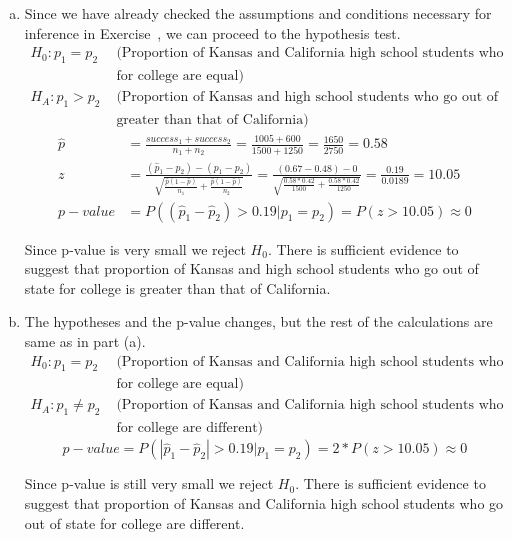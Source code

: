 {
\begin{enumerate}[(a)]

\item Since we have already checked the assumptions and conditions necessary for inference in Exercise~, we can proceed to the hypothesis test.
\begin{align*}
H_0: p_1 = p_2 &\text{ (Proportion of Kansas and California high school students who go out of state} \\
&\text{ for college are equal)} \\
H_A: p_1 > p_2 &\text{ (Proportion of Kansas and high school students who go out of state for college is} \\
&\text{ greater than that of California)}
\end{align*}
\begin{align*}
\hat{p} &= \frac{success_1 + success_2}{n_1 + n_2} = \frac{1005 + 600}{1500 + 1250} = \frac{1650}{2750} = 0.58 \\
z &= \frac{(\hat{p}_1 - \hat{p}_2) - (p_1 - p_2)}{\sqrt{ \frac{\hat{p} (1 - \hat{p})}{n_1} + \frac{\hat{p} (1 - \hat{p})}{n_2} }} = \frac{(0.67 - 0.48) - 0}{\sqrt{ \frac{0. 58 * 0.42}{1500} + \frac{0. 58 * 0.42}{1250} }} =  \frac{0.19}{0.0189} = 10.05 \\
p-value &= P((\hat{p}_1 - \hat{p}_2) > 0.19 | p_1 = p_2) = P(z > 10.05) \approx 0
\end{align*}

Since p-value is very small we reject $H_0$. There is sufficient evidence to suggest that proportion of Kansas and high school students who go out of state for college is greater than that of California. 

\item The hypotheses and the p-value changes, but the rest of the calculations are same as in part (a).
\begin{align*}
H_0: p_1 = p_2 &\text{ (Proportion of Kansas and California high school students who go out of state} \\
&\text{ for college are equal)} \\
H_A: p_1 \ne p_2 &\text{ (Proportion of Kansas and California high school students who go out of state} \\
&\text{ for college are different)}
\end{align*}
\[ p-value = P(| \hat{p}_1 - \hat{p}_2 | > 0.19 | p_1 = p_2) = 2 * P(z > 10.05) \approx 0 \]

Since p-value is still very small we reject $H_0$. There is sufficient evidence to suggest that proportion of Kansas and California high school students who go out of state for college are different.

\end{enumerate}
}

